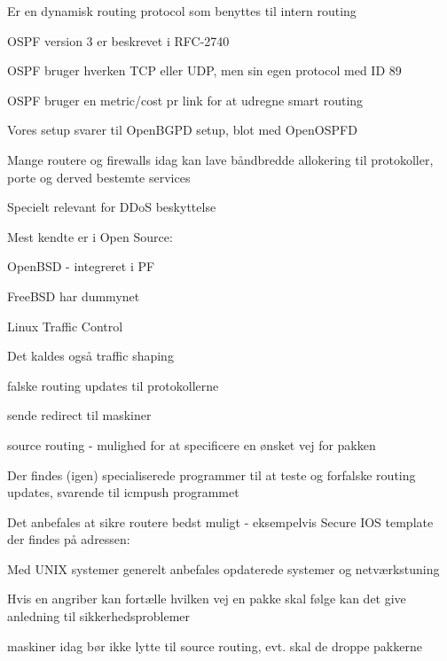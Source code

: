 \documentclass[Screen16to9,17pt]{foils}
\begin{document}
\begin{list1}
\item Er en dynamisk routing protocol som benyttes til intern routing
\item OSPF version 3 er beskrevet i RFC-2740
\item OSPF bruger hverken TCP eller UDP, men sin egen protocol med ID 89
\item OSPF bruger en metric/cost pr link for at udregne smart routing
\item {}
\item Vores setup svarer til OpenBGPD setup, blot med OpenOSPFD
\end{list1}






\begin{list1}
\item Mange routere og firewalls idag kan lave båndbredde allokering til
  protokoller, porte og derved bestemte services
  \item Specielt relevant for DDoS beskyttelse
\item Mest kendte er i Open Source:
\begin{list2}
\item OpenBSD - integreret i PF
\item FreeBSD har dummynet
\item Linux Traffic Control
\end{list2}
\item Det kaldes også traffic shaping
\end{list1}



\begin{list1}
  \item falske routing updates til protokollerne
\item sende redirect til maskiner
\item source routing - mulighed for at specificere en ønsket vej for
  pakken
\item Der findes (igen) specialiserede programmer til at teste og
  forfalske routing updates, svarende til icmpush programmet
\item Det anbefales at sikre routere bedst muligt - eksempelvis
Secure IOS template der findes på adressen:\\
{\small {}}
\item Med UNIX systemer generelt anbefales opdaterede systemer og netværkstuning
\end{list1}



\begin{list1}
\item Hvis en angriber kan fortælle hvilken vej en pakke skal følge
  kan det give anledning til sikkerhedsproblemer
\item maskiner idag bør ikke lytte til source routing, evt. skal de
  droppe pakkerne
\end{list1}
\end{document}
